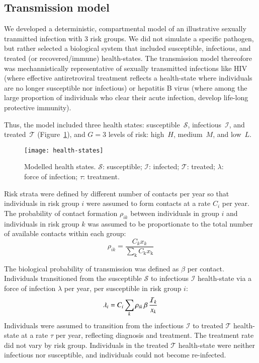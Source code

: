 \subsection{Transmission model}\label{ss:model-sim}
We developed a deterministic, compartmental model of an illustrative 
sexually tranmitted infection with 3 risk groups. We did not
simulate a specific pathogen, but rather selected a biological system
that included susceptible, infectious, and treated (or recovered/immune) health-states. 
The transmission model thereofore was mechannistically representative of sexually transmitted infections like
HIV (where effective antiretroviral treatment reflects a health-state where individuals
are no longer susceptible nor infectious) or hepatitis B virus (where among the large proportion
of individuals who clear their acute infection, develop life-long protective immunity). %

Thus, the model included three health states:
susceptible~$\mathcal{S}$, infectious~$\mathcal{I}$, and treated~$\mathcal{T}$
(Figure~\ref{fig:health-states}),
and $G = 3$ levels of risk:
high~$H$, medium~$M$, and low~$L$.
\begin{figure}
  \centering
  \texttt{[image: health-states]}
  \caption{Modelled health states.
    $\mathcal{S}$: susceptible;
    $\mathcal{I}$: infected;
    $\mathcal{T}$: treated;
    $\lambda$: force of infection;
    $\tau$: treatment.}
  \label{fig:health-states}
\end{figure}
Risk strata were defined by different number of contacts per year
so that individuals in risk group $i$ were assumed to
form contacts at a rate $C_{i}$ per year.
The probability of contact formation $\rho_{ik}$ between individuals in group $i$
and individuals in risk group $k$ was assumed to be
proportionate to the total number of available contacts within each group:
\begin{equation}
\rho_{ik} = \frac
{C_k x_k}
{\sum_{\mathrm{k}}C_{\mathrm{k}} x_{\mathrm{k}}}
\label{eq:rho}
\end{equation}
\par
The biological probability of transmission was defined as $\beta$ per contact.
Individuals transitioned from the
susceptible $\mathcal{S}$ to infectious $\mathcal{I}$ health-state
via a force of infection $\lambda$ per year, per susceptible in risk group $i$:
\begin{equation}
\lambda_{i} =
C_{i} \sum_k \rho_{ik} \thinspace  \beta \thinspace \frac{\mathcal{I}_k}{x_k}
\label{eq:foi}
\end{equation}
Individuals were assumed to transition from the
infectious $\mathcal{I}$ to treated $\mathcal{T}$ health-state
at a rate $\tau$ per year, reflecting diagnosis and treatment.
The treatment rate did not vary by risk group.
Individuals in the treated $\mathcal{T}$ health-state were neither infectious nor susceptible,
and individuals could not become re-infected.

